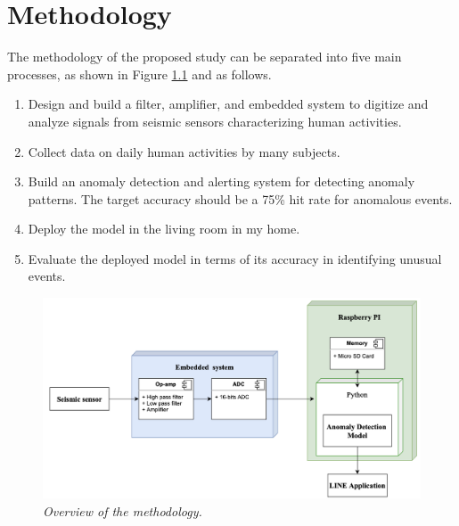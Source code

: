 \setlength{\parindent}{0in}
\setlength{\parskip}{1em}
\setlength{\baselineskip}{1.6em}

\chapter{Methodology}
\label{ch:methodology}

The methodology of the proposed study can be separated into five main processes, as shown in Figure \ref{fig:system_overview} and as follows.
\begin{enumerate}
  \item Design and build a filter, amplifier, and embedded system to digitize and analyze signals from seismic sensors characterizing human activities.
  \item Collect data on daily human activities by many subjects.
  \item Build an anomaly detection and alerting system for detecting anomaly patterns. The target accuracy should be a 75\% hit rate for anomalous events.
  \item Deploy the model in the living room in my home.
  \item Evaluate the deployed model in terms of its accuracy in identifying unusual events.
\end{enumerate}

\begin{figure}[H]
  \centering
  \caption[Overview of the methodology.]{\emph{Overview of the methodology.}}\label{fig:system_overview}
  \includegraphics[scale = 0.5]{figures/system_overview_2.jpg}
\end{figure}

